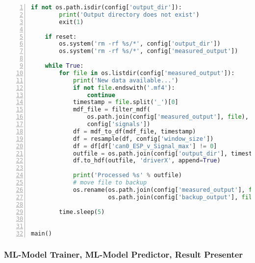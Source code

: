 \begin{lstlisting}[frame=lines, caption=Ausschnitt Fahreridentifikation, captionpos=b, label = lst:a_sw_dp, numbers=left, language=Python, showstringspaces=false, basicstyle=\footnotesize]
    if not os.path.isdir(config['output_dir']):
        print('Output directory does not exist')
        exit(1)

    if reset:
        os.system('rm -rf %s/*', config['output_dir'])
        os.system('rm -rf %s/*', config['measured_output'])

    while True:
        for file in os.listdir(config['measured_output']):
            print('New data available...')
            if not file.endswith('.mf4'):
                continue
            timestamp = file.split('_')[0]
            mdf_file = filter_mdf(
                os.path.join(config['measured_output'], file),
                config['signals'])
            df = mdf_to_df(mdf_file, timestamp)
            df = resample(df, config['window_size'])
            df = df[df['can0_ESP_v_Signal_max'] != 0]
            outfile = os.path.join(config['output_dir'], timestamp, '.hdf')
            df.to_hdf(outfile, 'driverX', append=True)

            print('Processed %s' % outfile)
            # move file to backup
            os.rename(os.path.join(config['measured_output'], file),
                      os.path.join(config['backup_output'], file))

        time.sleep(5)


main()
\end{lstlisting}

\subsubsection{ML-Model Trainer, ML-Model Predictor, Result Presenter}

